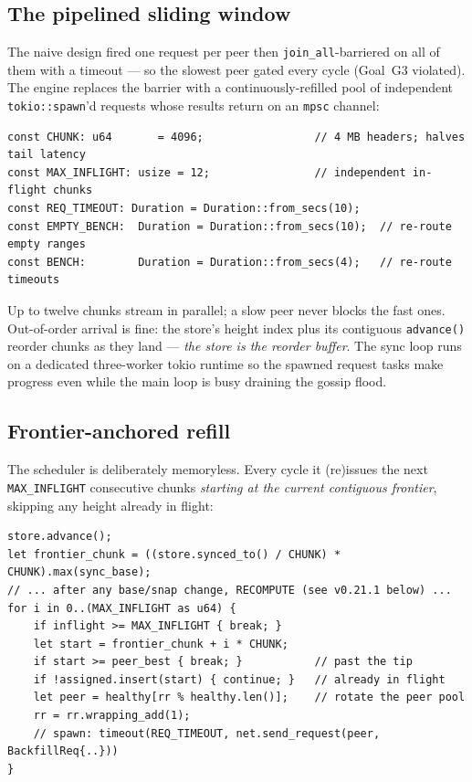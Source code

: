 \documentclass[11pt,a4paper]{article}
\newcommand{\code}[1]{\lstinline[basicstyle=\ttfamily\normalsize\color{codekw}]{#1}}
\begin{document}
\subsection{The pipelined sliding window}

The naive design fired one request per peer then \code{join_all}-barriered on all
of them with a timeout --- so the slowest peer gated every cycle (Goal~G3
violated). The engine replaces the barrier with a continuously-refilled pool of
independent \code{tokio::spawn}'d requests whose results return on an
\texttt{mpsc} channel:

\begin{lstlisting}
const CHUNK: u64       = 4096;                 // 4 MB headers; halves tail latency
const MAX_INFLIGHT: usize = 12;                // independent in-flight chunks
const REQ_TIMEOUT: Duration = Duration::from_secs(10);
const EMPTY_BENCH:  Duration = Duration::from_secs(10);  // re-route empty ranges
const BENCH:        Duration = Duration::from_secs(4);   // re-route timeouts
\end{lstlisting}

\noindent
Up to twelve chunks stream in parallel; a slow peer never blocks the fast ones.
Out-of-order arrival is fine: the store's height index plus its contiguous
\code{advance()} reorder chunks as they land --- \emph{the store is the reorder
buffer}. The sync loop runs on a dedicated three-worker tokio runtime so the
spawned request tasks make progress even while the main loop is busy draining the
gossip flood.

\subsection{Frontier-anchored refill}

The scheduler is deliberately memoryless. Every cycle it (re)issues the next
\texttt{MAX\_INFLIGHT} consecutive chunks \emph{starting at the current contiguous
frontier}, skipping any height already in flight:

\begin{lstlisting}
store.advance();
let frontier_chunk = ((store.synced_to() / CHUNK) * CHUNK).max(sync_base);
// ... after any base/snap change, RECOMPUTE (see v0.21.1 below) ...
for i in 0..(MAX_INFLIGHT as u64) {
    if inflight >= MAX_INFLIGHT { break; }
    let start = frontier_chunk + i * CHUNK;
    if start >= peer_best { break; }           // past the tip
    if !assigned.insert(start) { continue; }   // already in flight
    let peer = healthy[rr % healthy.len()];    // rotate the peer pool
    rr = rr.wrapping_add(1);
    // spawn: timeout(REQ_TIMEOUT, net.send_request(peer, BackfillReq{..}))
}
\end{lstlisting}
\end{document}
